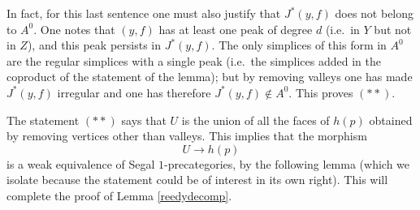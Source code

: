 In fact, for this last sentence one must also justify that
$J^{\ast}(y,f)$ does not belong to $A^0$. One notes that $(y,f)$ has
at least one peak of degree $d$ (i.e.\ in $Y$ but not in $Z$), and this peak
persists in
$J^{\ast}(y,f)$. The only simplices of this form in $A^0$ are
the regular simplices with a single peak (i.e.\ the simplices added in
the coproduct of the statement of the lemma); but by removing valleys one has
made
$J^{\ast}(y,f)$ irregular and one has therefore $J^{\ast}(y,f)\not \in A^0$.
This
proves $(\ast \ast )$.

The statement $(\ast \ast )$ says that $U$ is the union of all the
faces of $h(p)$ obtained by removing vertices other than valleys.
This implies
that the morphism
$$
U\rightarrow
h(p)
$$
is a weak equivalence of Segal $1$-precategories, by the following
lemma (which we isolate because the statement could be of interest in its own
right). This will complete the
proof of
Lemma \ref{reedydecomp}.
\eop

